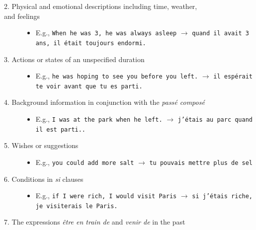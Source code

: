 \documentclass[11pt, oneside]{book}
\begin{document}
{\begin{description}
	\item[2. Physical and emotional descriptions including time, weather, \\ and feelings] 

		\begin{itemize}
			\textcolor{white}{a} 
			\item[] E.g., \texttt{When he was 3, he was always asleep} $\rightarrow$ \texttt{quand il avait 3 ans, il \'etait toujours endormi.}
		\end{itemize}
		
	\item[3. Actions or states of an unspecified duration] 
	
		\begin{itemize}
			\textcolor{white}{a} 
			\item[] E.g., \texttt{he was hoping to see you before you left.} $\rightarrow$ \texttt{il esp\'erait te voir avant que tu es parti.}
		\end{itemize}
		
	\item[4. Background information in conjunction with the \textit{pass\'e compos\'e}] 
	
		\begin{itemize}
			\textcolor{white}{a} 
			\item[] E.g., \texttt{I was at the park when he left.} $\rightarrow$ \texttt{j'\'etais au parc quand il est parti..}
		\end{itemize}
	
	\item[5. Wishes or suggestions] 
	
		\begin{itemize}
			\textcolor{white}{a} 
			\item[] E.g., \texttt{you could add more salt} $\rightarrow$ \texttt{tu pouvais mettre plus de sel}
		\end{itemize}
		
		
	\item[6. Conditions in \textit{si} clauses] 
	
		\begin{itemize}
			\textcolor{white}{a} 
			\item[] E.g., \texttt{if I were rich, I would visit Paris} $\rightarrow$ \texttt{si j'\'etais riche, je visiterais le Paris.}
		\end{itemize}
		
	\item[7. The expressions \textit{\^etre en train de} and \textit{venir de} in the past
] 
	

\end{description}}
\end{document}
